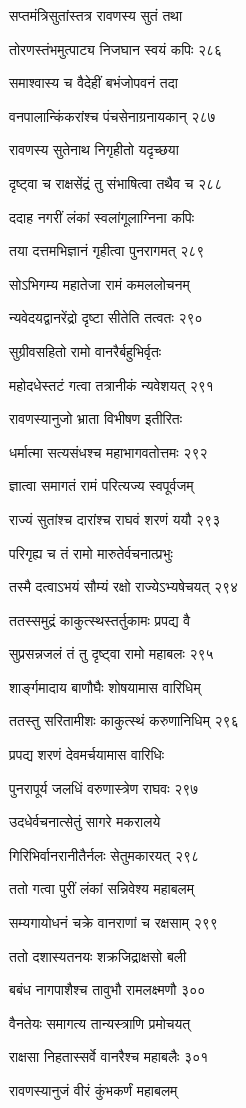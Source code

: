 सप्तमंत्रिसुतांस्तत्र रावणस्य सुतं तथा

तोरणस्तंभमुत्पाट्य निजघान स्वयं कपिः २८६

समाश्वास्य च वैदेहीं बभंजोपवनं तदा

वनपालान्किंकरांश्च पंचसेनाग्रनायकान् २८७

रावणस्य सुतेनाथ निगृहीतो यदृच्छया

दृष्ट्वा च राक्षसेंद्रं तु संभाषित्वा तथैव च २८८

ददाह नगरीं लंकां स्वलांगूलाग्निना कपिः

तया दत्तमभिज्ञानं गृहीत्वा पुनरागमत् २८९

सोऽभिगम्य महातेजा रामं कमललोचनम्

न्यवेदयद्वानरेंद्रो दृष्टा सीतेति तत्वतः २९०

सुग्रीवसहितो रामो वानरैर्बहुभिर्वृतः

महोदधेस्तटं गत्वा तत्रानीकं न्यवेशयत् २९१

रावणस्यानुजो भ्राता विभीषण इतीरितः

धर्मात्मा सत्यसंधश्च महाभागवतोत्तमः २९२

ज्ञात्वा समागतं रामं परित्यज्य स्वपूर्वजम्

राज्यं सुतांश्च दारांश्च राघवं शरणं ययौ २९३

परिगृह्य च तं रामो मारुतेर्वचनात्प्रभुः

तस्मै दत्वाऽभयं सौम्यं रक्षो राज्येऽभ्यषेचयत् २९४

ततस्समुद्रं काकुत्स्थस्तर्तुकामः प्रपद्य वै

सुप्रसन्नजलं तं तु दृष्ट्वा रामो महाबलः २९५

शार्ङ्गमादाय बाणौघैः शोषयामास वारिधिम्

ततस्तु सरितामीशः काकुत्स्थं करुणानिधिम् २९६

प्रपद्य शरणं देवमर्चयामास वारिधिः

पुनरापूर्य जलधिं वरुणास्त्रेण राघवः २९७

उदधेर्वचनात्सेतुं सागरे मकरालये

गिरिभिर्वानरानीतैर्नलः सेतुमकारयत् २९८

ततो गत्वा पुरीं लंकां सन्निवेश्य महाबलम्

सम्यगायोधनं चक्रे वानराणां च रक्षसाम् २९९

ततो दशास्यतनयः शक्रजिद्राक्षसो बली

बबंध नागपाशैश्च तावुभौ रामलक्ष्मणौ ३००

वैनतेयः समागत्य तान्यस्त्राणि प्रमोचयत्

राक्षसा निहतास्सर्वे वानरैश्च महाबलैः ३०१

रावणस्यानुजं वीरं कुंभकर्णं महाबलम्

